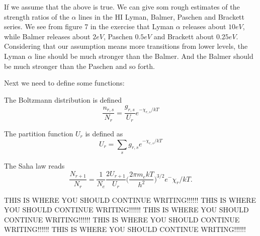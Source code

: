 \documentclass{aa}   %
\begin{document}
If we assume that the above is true. We can give som rough estimates of the strength ratios of the $\alpha$ lines in the HI Lyman, Balmer, Paschen and Brackett series. We see from figure 7 in the exercise that Lyman $\alpha$ releases about $10 eV$, while Balmer releases about $2 eV$, Paschen $0.5eV$ and Brackett about $0.25 eV$. Considering that our assumption means more transitions from lower levels, the Lyman $\alpha$ line should be much stronger than the Balmer. And the Balmer should be much stronger than the Paschen and so forth. 

Next we need to define some functions:

The Boltzmann distribution is defined
\begin{equation}
\frac{n_{r,s}}{N_r} = \frac{g_{r,s}}{U_r} e^{-\chi_{r,s}/kT} 
\end{equation}

The partition function $U_r$ is defined as
\begin{equation}
 U_r = \sum_s g_{r,s} e^{-\chi_{r,s}/kT}
\end{equation}

The Saha law reads
\begin{equation}
 \frac{N_{r+1}}{N_r} = \frac{1}{N_e}\frac{2U_{r+1}}{U_r}\bigg(\frac{2\pi m_e kT}{h^2}\bigg)^{3/2} e^-{\chi_r/kT}.
\end{equation}



THIS IS WHERE YOU SHOULD CONTINUE WRITING!!!!!!
THIS IS WHERE YOU SHOULD CONTINUE WRITING!!!!!!
THIS IS WHERE YOU SHOULD CONTINUE WRITING!!!!!!
THIS IS WHERE YOU SHOULD CONTINUE WRITING!!!!!!
THIS IS WHERE YOU SHOULD CONTINUE WRITING!!!!!!
\end{document}
